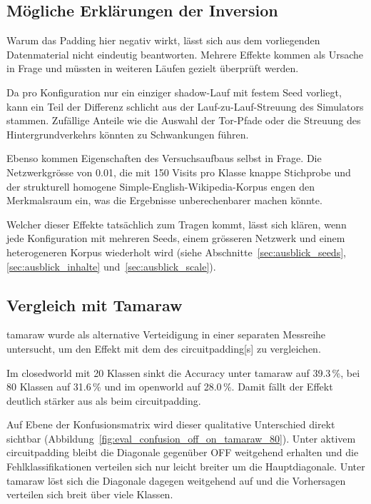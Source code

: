 \subsection{Mögliche Erklärungen der Inversion}
\label{sec:eval_reduced_diskussion}

Warum das Padding hier negativ wirkt, lässt sich aus dem vorliegenden Datenmaterial nicht eindeutig beantworten.
Mehrere Effekte kommen als Ursache in Frage und müssten in weiteren Läufen gezielt überprüft werden.

Da pro Konfiguration nur ein einziger \gls{shadow}-Lauf mit festem Seed vorliegt, kann ein Teil der Differenz schlicht aus der Lauf-zu-Lauf-Streuung des Simulators stammen.
Zufällige Anteile wie die Auswahl der Tor-Pfade oder die Streuung des Hintergrundverkehrs könnten zu Schwankungen führen.

Ebenso kommen Eigenschaften des Versuchsaufbaus selbst in Frage.
Die Netzwerkgrösse von 0.01, die mit 150 Visits pro Klasse knappe Stichprobe und der strukturell homogene Simple-English-Wikipedia-Korpus engen den Merkmalsraum ein, was die Ergebnisse unberechenbarer machen könnte.

Welcher dieser Effekte tatsächlich zum Tragen kommt, lässt sich klären, wenn jede Konfiguration mit mehreren Seeds, einem grösseren Netzwerk und einem heterogeneren Korpus wiederholt wird (siehe Abschnitte~\ref{sec:ausblick_seeds}, \ref{sec:ausblick_inhalte} und~\ref{sec:ausblick_scale}).

\subsection{Vergleich mit Tamaraw}
\label{sec:eval_tamaraw}

\gls{tamaraw} wurde als alternative Verteidigung in einer separaten Messreihe untersucht, um den Effekt mit dem des \gls{circuitpadding}[s] zu vergleichen.


Im \gls{closedworld} mit 20 Klassen sinkt die Accuracy unter \gls{tamaraw} auf 39.3\,\%, bei 80 Klassen auf 31.6\,\% und im \gls{openworld} auf 28.0\,\%.
Damit fällt der Effekt deutlich stärker aus als beim \gls{circuitpadding}.

Auf Ebene der Konfusionsmatrix wird dieser qualitative Unterschied direkt sichtbar (Abbildung~\ref{fig:eval_confusion_off_on_tamaraw_80}).
Unter aktivem \gls{circuitpadding} bleibt die Diagonale gegenüber OFF weitgehend erhalten und die Fehlklassifikationen verteilen sich nur leicht breiter um die Hauptdiagonale.
Unter \gls{tamaraw} löst sich die Diagonale dagegen weitgehend auf und die Vorhersagen verteilen sich breit über viele Klassen.

